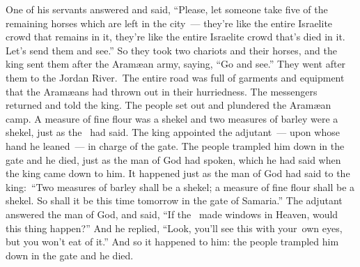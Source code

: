 \begin{inparaenum}
   One of his servants answered and said, ``Please, let someone take five of the remaining horses which are left in the city\understood{}~--- they're like the entire Israelite crowd that remains in it, they're like the entire Israelite crowd that's died in it. Let's send them and see.''%
   So they took two chariots and their horses, and the king sent them after the Aram\ae{}an army, saying, ``Go and see.''%
   They went after them to the Jordan River.\understood\ The entire road was full of garments and equipment that the Aram\ae{}ans had thrown out in their hurriedness. The messengers returned and told the king.%
   The people set out and plundered the Aram\ae{}an camp. A measure of fine flour was a shekel and two measures of barley were a shekel, just as the \lord\ had said.%
   The king appointed the adjutant~--- upon whose hand he leaned~--- in charge of the gate. The people trampled him down in the gate and he died, just as the man of God had spoken, which he had said when the king came down to him.%
   It happened just as the man of God had said to the king:\, ``Two measures of barley shall be a shekel; a measure of fine flour shall be a shekel. So shall it be this time tomorrow in the gate of Samaria.''%
   The adjutant answered the man of God, and said, ``If the \lord\ made windows in Heaven, would this thing happen?'' And he replied, ``Look, you'll see this with your\understood\ own eyes, but you won't eat of it.''%
   And so it happened to him: the people trampled him down in the gate and he died.%
\end{inparaenum}
